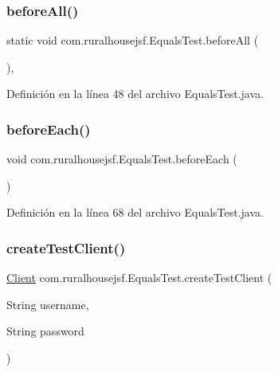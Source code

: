 \subsubsection{\texorpdfstring{beforeAll()}{beforeAll()}}
{\footnotesize\ttfamily static void com.\+ruralhousejsf.\+Equals\+Test.\+before\+All (\begin{DoxyParamCaption}{ }\end{DoxyParamCaption})\hspace{0.3cm}{\ttfamily [static]}, {\ttfamily [package]}}



Definición en la línea 48 del archivo Equals\+Test.\+java.

\mbox{\label{classcom_1_1ruralhousejsf_1_1_equals_test_ac6b6f6de31519a6882e0ec812b03442c}} 
\subsubsection{\texorpdfstring{beforeEach()}{beforeEach()}}
{\footnotesize\ttfamily void com.\+ruralhousejsf.\+Equals\+Test.\+before\+Each (\begin{DoxyParamCaption}{ }\end{DoxyParamCaption})\hspace{0.3cm}{\ttfamily [package]}}



Definición en la línea 68 del archivo Equals\+Test.\+java.

\mbox{\label{classcom_1_1ruralhousejsf_1_1_equals_test_a08081415d14d86f7b8a63fe7270546dc}} 
\subsubsection{\texorpdfstring{createTestClient()}{createTestClient()}}
{\footnotesize\ttfamily \mbox{\hyperlink{classcom_1_1ruralhousejsf_1_1domain_1_1_client}{Client}} com.\+ruralhousejsf.\+Equals\+Test.\+create\+Test\+Client (\begin{DoxyParamCaption}\item[{String}]{username,  }\item[{String}]{password }\end{DoxyParamCaption})\hspace{0.3cm}{\ttfamily [private]}}

